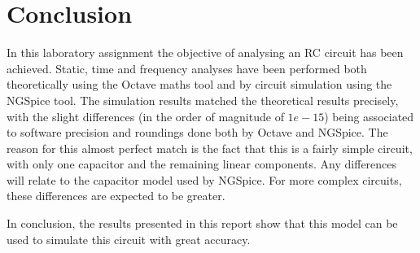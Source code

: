 \section{Conclusion}
\label{sec:conclusion}

\par In this laboratory assignment the objective of analysing an RC circuit has been
achieved. Static, time and frequency analyses have been performed both
theoretically using the Octave maths tool and by circuit simulation using the
NGSpice tool. The simulation results matched the theoretical results
precisely, with the slight differences (in the order of magnitude of $1e-15$) being associated to software precision and roundings done both by Octave and NGSpice. The reason for this almost perfect match is the fact that this is a fairly simple circuit, with only one capacitor and the remaining linear components. Any differences will relate to the capacitor model used by NGSpice. For more complex circuits, these differences are expected to be greater.

In conclusion, the results presented in this report show that this model can be used to simulate this circuit with great accuracy.
